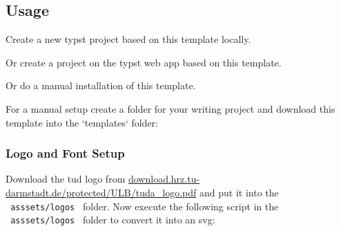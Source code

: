 \subsection{Usage}\label{usage}

Create a new typst project based on this template locally.

\begin{Shaded}
\begin{Highlighting}[]

\end{Highlighting}
\end{Shaded}

Or create a project on the typst web app based on this template.

Or do a manual installation of this template.

For a manual setup create a folder for your writing project and download
this template into the `templates` folder:

\begin{Shaded}
\begin{Highlighting}[]
\KeywordTok{\&\&} 
\end{Highlighting}
\end{Shaded}

\subsubsection{Logo and Font Setup}\label{logo-and-font-setup}

Download the tud logo from
\href{https://download.hrz.tu-darmstadt.de/protected/ULB/tuda_logo.pdf}{download.hrz.tu-darmstadt.de/protected/ULB/tuda\_logo.pdf}
and put it into the \texttt{\ asssets/logos\ } folder. Now execute the
following script in the \texttt{\ asssets/logos\ } folder to convert it
into an svg:

\begin{Shaded}
\begin{Highlighting}[]
\end{Highlighting}
\end{Shaded}

